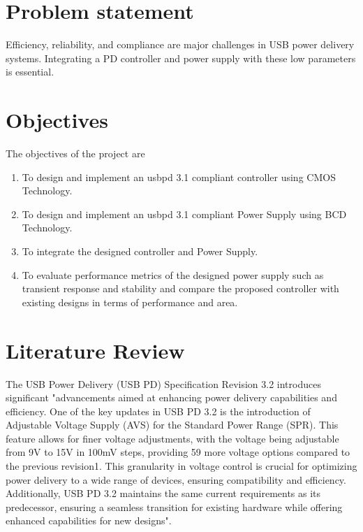 \section[Problem statement]{\textbf{Problem statement}}

Efficiency, reliability, and compliance are major challenges in USB power delivery systems. Integrating a PD controller and power supply with these low parameters is essential.


\section[Objectives]{\textbf{Objectives}}
The objectives of the project are
\begin{enumerate}
\item To design and implement an \gls{usbpd} 3.1 compliant controller using CMOS Technology.
\item To design and implement an \gls{usbpd} 3.1 compliant Power Supply using BCD Technology.
\item To integrate the designed controller and Power Supply.
\item To evaluate performance metrics of the designed power supply such as transient response and stability and compare the proposed controller with existing designs in terms of performance and area.
\end{enumerate}

\section[Literature Review]{\textbf{Literature Review}}
The USB Power Delivery (USB PD) Specification Revision 3.2 introduces significant "advancements aimed at enhancing power delivery capabilities and efficiency. One of the key updates in USB PD 3.2 is the introduction of Adjustable Voltage Supply (AVS) for the Standard Power Range (SPR). This feature allows for finer voltage adjustments, with the voltage being adjustable from 9V to 15V in 100mV steps, providing 59 more voltage options compared to the previous revision1. This granularity in voltage control is crucial for optimizing power delivery to a wide range of devices, ensuring compatibility and efficiency. Additionally, USB PD 3.2 maintains the same current requirements as its predecessor, ensuring a seamless transition for existing hardware while offering enhanced capabilities for new designs"\cite{usb_power_delivery}.

